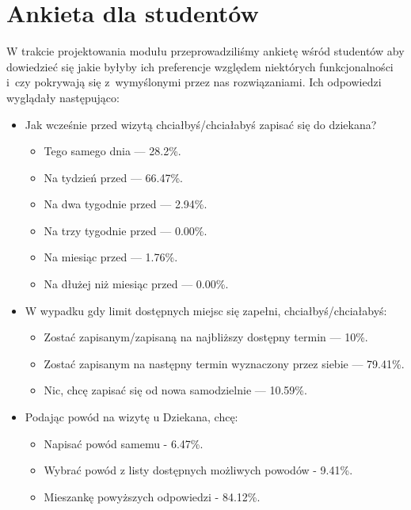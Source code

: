 \documentclass[licencjacka]{pracamgr}
\begin{document}
\section{Ankieta dla studentów}
W trakcie projektowania modułu przeprowadziliśmy ankietę wśród studentów aby dowiedzieć się jakie byłyby ich preferencje względem niektórych funkcjonalności i~czy pokrywają się z~wymyślonymi przez nas rozwiązaniami. Ich odpowiedzi wyglądały następująco:
\begin{itemize}
\setlength\itemsep{0,05em}
\item Jak wcześnie przed wizytą chciałbyś/chciałabyś zapisać się do dziekana?
\begin{itemize}
\setlength\itemsep{0,05em}
\item Tego samego dnia --- 28.2\%.
\item Na tydzień przed --- 66.47\%.
\item Na dwa tygodnie przed --- 2.94\%.
\item Na trzy tygodnie przed --- 0.00\%.
\item Na miesiąc przed --- 1.76\%.
\item Na dłużej niż miesiąc przed --- 0.00\%.
\end{itemize}

\item W wypadku gdy limit dostępnych miejsc się zapełni, chciałbyś/chciałabyś:
\begin{itemize}
\setlength\itemsep{0,05em}
\item Zostać zapisanym/zapisaną na najbliższy dostępny termin --- 10\%.
\item Zostać zapisanym na następny termin wyznaczony przez siebie --- 79.41\%.
\item Nic, chcę zapisać się od nowa samodzielnie --- 10.59\%.
\end{itemize}

\item Podając powód na wizytę u Dziekana, chcę:
\begin{itemize}
\setlength\itemsep{0,05em}

\item Napisać powód samemu - 6.47\%.
\item Wybrać powód z listy dostępnych możliwych powodów - 9.41\%.
\item Mieszankę powyższych odpowiedzi - 84.12\%.
\end{itemize}


\end{itemize}
\end{document}
